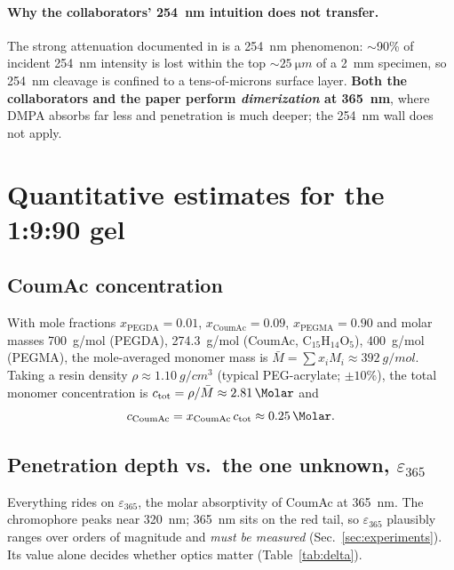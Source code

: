 \documentclass[11pt]{article}
\newcommand{\eps}{\varepsilon_{365}}
\newcommand{\Coum}{\text{CoumAc}}
\begin{document}
\paragraph{Why the collaborators' \SI{254}{nm} intuition does not transfer.}
The strong attenuation documented in \cite{vanzanten2026} is a \SI{254}{nm} phenomenon:
$\sim$90\% of incident \SI{254}{nm} intensity is lost within the top $\sim\SI{25}{\micro m}$
of a \SI{2}{mm} specimen, so \SI{254}{nm} cleavage is confined to a
tens-of-microns surface layer. \textbf{Both the collaborators and the paper perform
\emph{dimerization} at \SI{365}{nm}}, where DMPA absorbs far less and penetration is much
deeper; the \SI{254}{nm} wall does not apply.

\section{Quantitative estimates for the 1:9:90 gel}

\subsection{CoumAc concentration}
With mole fractions $x_{\text{PEGDA}}{=}0.01$, $x_{\Coum}{=}0.09$, $x_{\text{PEGMA}}{=}0.90$
and molar masses \SI{700}{g/mol} (PEGDA), \SI{274.3}{g/mol} (CoumAc, $\mathrm{C_{15}H_{14}O_5}$),
\SI{400}{g/mol} (PEGMA), the mole-averaged monomer mass is
$\bar M = \sum x_i M_i \approx \SI{392}{g/mol}$. Taking a resin density
$\rho \approx \SI{1.10}{g/cm^3}$ (typical PEG-acrylate; $\pm10\%$), the total monomer
concentration is $c_\text{tot}=\rho/\bar M \approx \SI{2.81}{\Molar}$ and
\begin{equation}
  c_{\Coum} = x_{\Coum}\, c_\text{tot} \approx \SI{0.25}{\Molar}.
  \label{eq:conc}
\end{equation}

\subsection{Penetration depth vs.\ the one unknown, $\eps$}
Everything rides on $\eps$, the molar absorptivity of CoumAc at \SI{365}{nm}. The chromophore
peaks near \SI{320}{nm}; \SI{365}{nm} sits on the red tail, so $\eps$ plausibly ranges over
orders of magnitude and \emph{must be measured} (Sec.~\ref{sec:experiments}). Its value
alone decides whether optics matter (Table~\ref{tab:delta}).
\end{document}
